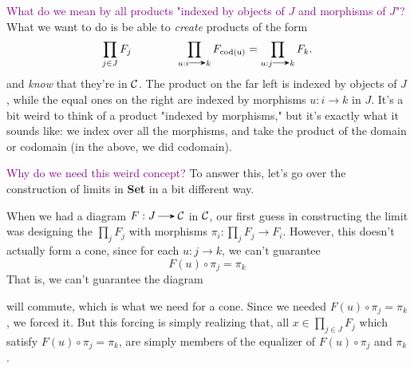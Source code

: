     \textcolor{purple}{What do we mean by all products "indexed by 
    objects of $J$ and morphisms of $J$"?} What we want to do is be able 
    to \textit{create} products of the form 
    \[
        \prod_{j \in J}F_j \qquad\qquad \prod_{u:i \to k} F_\text{\text{cod}(u)} = \prod_{u:j \to k}F_k.   
    \]
    and \textit{know} that they're in $\mathcal{C}$. 
    The product on the far left is indexed by objects of $J$, while the equal  
    ones on the right are indexed by morphisms $u: i \to k$ in $J$. It's a
    bit weird to think of a product "indexed by morphisms," but it's   
    exactly what it sounds like: we index over all the morphisms, and 
    take the product of the domain or codomain (in the above, we did codomain).
    
    \textcolor{purple}{Why do we need this weird concept?} To 
    answer this, let's go over the construction of limits in \textbf{Set}
    in a bit different way. 

    When we had a diagram $F: J \to \cc$ in $\mathcal{C}$, our first guess 
    in constructing the limit was designing the $\displaystyle \prod_{j}F_j$
    with morphisms $\displaystyle \pi_i : \prod_{j}F_j \to F_i$. However, 
    this doesn't actually form a cone, since for each $u: j \to k$,
    we can't guarantee 
    \[
        F(u) \circ \pi_j = \pi_k
    \]
    That is, we can't guarantee the diagram 
    \begin{center}
    \end{center}
    will commute, which is what we need for a cone. Since we needed 
    $F(u) \circ \pi_j = \pi_k$, we forced it. But this forcing is 
    simply realizing that, all $\displaystyle x \in \prod_{j \in J}F_j$ 
    which satisfy $F(u) \circ \pi_j = \pi_k$, are simply 
    members of the equalizer of $F(u) \circ \pi_j$ and $\pi_k$. 

